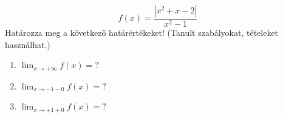 \documentclass[11pt]{scrartcl}
\begin{document}
\[
	f(x) = \frac{\left| x^2 + x - 2 \right|}{x^2 - 1}
\]
Határozza meg a következő határértékeket! (Tanult szabályokat, tételeket
használhat.)
\begin{enumerate}
	\item \(\displaystyle \lim_{x \to +\infty} f(x) = ?\)

	\item \(\displaystyle \lim_{x \to -1 - 0} f(x) = ?\)

	\item \(\displaystyle \lim_{x \to +1 + 0} f(x) = ?\)
\end{enumerate}
\end{document}
